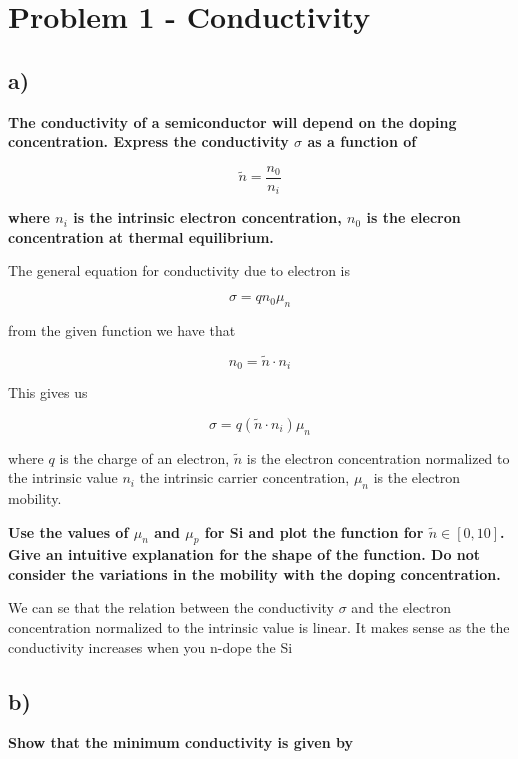 \section{Problem 1 - Conductivity}
\subsection*{a)}
\textbf{The conductivity of a semiconductor will depend on the doping concentration. Express the conductivity $\sigma$ as a function of}

\begin{equation*}
     \tilde{n}=\frac{n_{0}}{n_{i}} 
\end{equation*}

\textbf{where $n_i$ is the intrinsic electron concentration, $n_0$ is the elecron concentration at thermal equilibrium.}

The general equation for conductivity due to electron is 

\begin{equation*}
    \sigma=q n_0 \mu_{n}
\end{equation*}

from the given function we have that 

\begin{equation*}
    n_0=\tilde{n}\cdot n_i
\end{equation*}

This gives us

\begin{equation*}
    \sigma=q (\tilde{n}\cdot n_i) \mu_{n} 
\end{equation*}

where $q$ is the charge of an electron, $\tilde{n}$ is the electron concentration normalized to the intrinsic value $n_i$ the intrinsic carrier concentration, $\mu_{n}$ is the electron mobility.

\textbf{Use the values of $\mu_n$ and $\mu_p$ for Si and plot the function for $\tilde{n} \in [0, 10]$. Give an intuitive explanation for the shape of the function. Do not consider the variations in the mobility with the doping concentration.}


We can se that the relation between the conductivity $\sigma$ and the  electron concentration normalized to the intrinsic value is linear. It makes sense as the the conductivity increases when you n-dope the Si

\subsection*{b)}
\textbf{Show that the minimum conductivity is given by}

